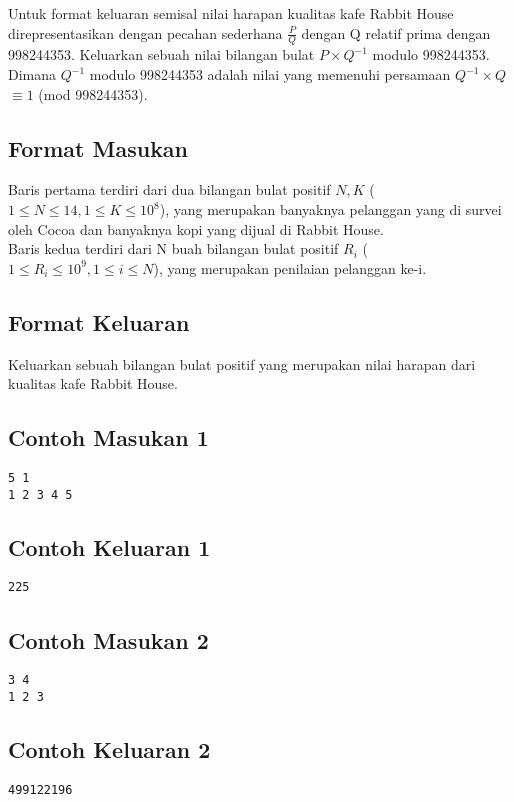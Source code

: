 \documentclass{article}
\begin{document}
Untuk format keluaran semisal nilai harapan kualitas kafe Rabbit House direpresentasikan dengan pecahan sederhana $\frac{P}{Q}$ dengan Q relatif prima dengan 998244353. Keluarkan sebuah nilai bilangan bulat $P \times Q^{-1}$ modulo 998244353. Dimana $Q^{-1}$ modulo 998244353 adalah nilai yang memenuhi persamaan $Q^{-1} \times Q$ $\equiv 1$ (mod 998244353). 

\subsection*{Format Masukan}

Baris pertama terdiri dari dua bilangan bulat positif $N, K$ ($1 \leq N \leq 14, 1 \leq K \leq 10^{8}$), yang merupakan banyaknya pelanggan yang di survei oleh Cocoa dan banyaknya kopi yang dijual di Rabbit House.\\
Baris kedua terdiri dari N buah bilangan bulat positif $R_i$ ($1 \leq R_i \leq 10^9, 1 \leq i \leq N $), yang merupakan penilaian pelanggan ke-i.

\subsection*{Format Keluaran}

Keluarkan sebuah bilangan bulat positif yang merupakan nilai harapan dari kualitas kafe Rabbit House.

\begin{multicols}{2}
\subsection*{Contoh Masukan 1}
\begin{lstlisting}
5 1
1 2 3 4 5
\end{lstlisting}
\columnbreak
\subsection*{Contoh Keluaran 1}
\begin{lstlisting}
225
\end{lstlisting}
\vfill
\null
\end{multicols}

\begin{multicols}{2}
\subsection*{Contoh Masukan 2}
\begin{lstlisting}
3 4
1 2 3
\end{lstlisting}
\columnbreak
\subsection*{Contoh Keluaran 2}
\begin{lstlisting}
499122196
\end{lstlisting}
\vfill
\null
\end{multicols}
\end{document}
